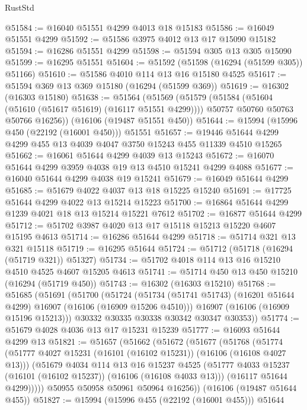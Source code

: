 \begin{lexlean}{RustStd}
\begin{coremodule}
@51584 := @16040 @51551 @4299 @4013 @18 @15183
@51586 := @16049 @51551 @4299
@51592 := @51586 @3975 @4012 @13 @17 @15090 @15182
@51594 := @16286 @51551 @4299
@51598 := @51594 @305 @13 @305 @15090
@51599 := @16295 @51551
@51604 := @51592 (@51598 (@16294 (@51599 @305)) @51166)
@51610 := @51586 @4010 @114 @13 @16 @15180 @4525
@51617 := @51594 @369 @13 @369 @15180 (@16294 (@51599 @369))
@51619 := @16302 (@16303 @15180)
@51638 := @51564
    (@51569
      (@51579
        (@51584 (@51604 (@51610 (@51617 @51619) (@16117 @51551 @4299))))
        @50757
        @50760
        @50763
        @50766
        @16256))
    (@16106 (@19487 @51551 @450))
@51644 := @15994 (@15996 @450 (@22192 (@16001 @450))) @51551
@51657 := @19446 @51644 @4299 @4299 @455 @13 @4039 @4047 @3750 @15243 @455 @11339 @4510 @15265
@51662 := @16061 @51644 @4299 @4039 @13 @15243
@51672 := @16070 @51644 @4299 @3959 @4038 @19 @13 @4510 @15241 @4299 @4088
@51677 := @16040 @51644 @4299 @4038 @19 @15241
@51679 := @16049 @51644 @4299
@51685 := @51679 @4022 @4037 @13 @18 @15225 @15240
@51691 := @17725 @51644 @4299 @4022 @13 @15214 @15223
@51700 := @16864 @51644 @4299 @1239 @4021 @18 @13 @15214 @15221 @7612
@51702 := @16877 @51644 @4299
@51712 := @51702 @3987 @4020 @13 @17 @15118 @15213 @15220 @4607 @15195 @4613
@51714 := @16286 @51644 @4299
@51718 := @51714 @321 @13 @321 @15118
@51719 := @16295 @51644
@51724 := @51712 (@51718 (@16294 (@51719 @321)) @51327)
@51734 := @51702 @4018 @114 @13 @16 @15210 @4510 @4525 @4607 @15205 @4613
@51741 := @51714 @450 @13 @450 @15210 (@16294 (@51719 @450))
@51743 := @16302 (@16303 @15210)
@51768 := @51685
    (@51691
      (@51700
        (@51724
          (@51734 (@51741 @51743) (@16201 @51644 @4299) @16907 (@16106 (@16909 @15206 @4510)))
          @16907
          (@16106 (@16909 @15196 @15213)))
        @30332
        @30335
        @30338
        @30342
        @30347
        @30353))
@51774 := @51679 @4028 @4036 @13 @17 @15231 @15239
@51777 := @16093 @51644 @4299 @13
@51821 := @51657
    (@51662
      (@51672
        (@51677
          (@51768
            (@51774
              (@51777 @4027 @15231 (@16101 (@16102 @15231)) (@16106 (@16108 @4027 @13)))
              (@51679
                @4034
                @114
                @13
                @16
                @15237
                @4525
                (@51777 @4033 @15237 (@16101 (@16102 @15237)) (@16106 (@16108 @4033 @13)))
                (@16117 @51644 @4299)))))
        @50955
        @50958
        @50961
        @50964
        @16256))
    (@16106 (@19487 @51644 @455))
@51827 := @15994 (@15996 @455 (@22192 (@16001 @455))) @51644

\end{coremodule}
\end{lexlean}
